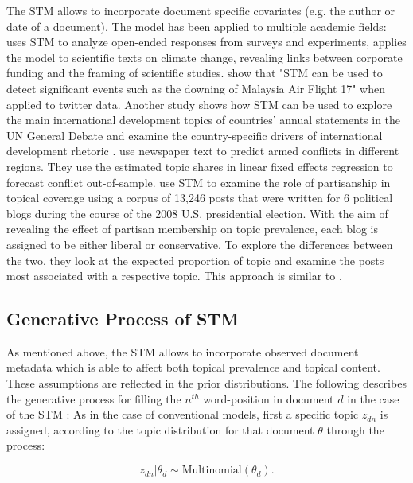 \documentclass[12pt,a4paper,notitlepage]{article}
\begin{document}
The STM allows to incorporate document specific covariates (e.g. the author or date of a document). The model has been applied to multiple academic fields: \citet{roberts_structural_2014} uses STM to analyze open-ended responses from surveys and experiments, \citet{farrell_corporate_2016} applies the model to scientific texts on climate change, revealing links between corporate funding and the framing of scientific studies. \citet{mishler_using_2015} show that "STM can be used to detect significant events such as the downing of Malaysia Air Flight 17" when applied to twitter data. Another study shows how STM can be used to explore the main international development topics of countries’ annual statements in the UN General Debate and examine the country-specific drivers of international development rhetoric \citep{baturo_what_2017}. \citet{mueller_reading_2016} use newspaper text to predict armed conflicts in different regions. They use the estimated topic shares in linear fixed effects regression to forecast conflict out-of-sample. \citet{roberts_navigating_2016} use STM to examine the role of partisanship in topical coverage using a corpus of 13,246 posts that were written for 6 political blogs during the course of the 2008 U.S. presidential election. With the aim of revealing the effect of partisan membership on topic prevalence, each blog is assigned to be either liberal or conservative. To explore the differences between the two, they look at the expected proportion of topic and examine the posts most associated with a respective topic. This approach is similar to \citet{roberts_model_2016}. 

\subsection{Generative Process of STM}\label{ch_generativeProcess}

 As mentioned above, the STM allows to incorporate observed document metadata which is able to affect both topical prevalence and topical content. These assumptions are reflected in the prior distributions. The following describes the generative process for filling the $n^{th}$ word-position in document $d$ in the case of the STM \citep{roberts_structural_2013}: As in the case of conventional models, first a specific topic $z_{dn}$ is assigned, according to the topic distribution for that document $\theta$ through the process:

\begin{equation}
	z_{dn}|\theta_d \sim \textrm{Multinomial}(\theta_d).
\end{equation}
\end{document}
